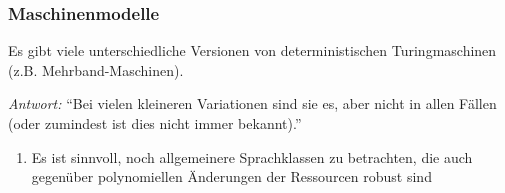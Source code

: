 \documentclass[aspectratio=1610,onlymath]{beamer}
\begin{document}
\begin{frame}\frametitle{Maschinenmodelle}

Es gibt viele unterschiedliche Versionen von deterministischen Turingmaschinen (z.B. Mehrband-Maschinen).\\

\pause

\emph{Antwort:} "`Bei vielen kleineren Variationen sind sie es, aber nicht in allen Fällen (oder zumindest ist dies nicht immer bekannt)."'

\pause

\begin{enumerate}[$\leadsto$]
\item Es ist sinnvoll, \alert{noch allgemeinere Sprachklassen} zu betrachten, die auch gegenüber polynomiellen Änderungen der Ressourcen robust sind
\end{enumerate}

\end{frame}
\end{document}
